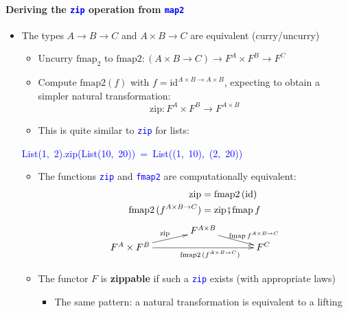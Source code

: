 \paragraph{Deriving the \texttt{\textcolor{blue}{\footnotesize{}zip}} operation
from \texttt{\textcolor{blue}{\footnotesize{}map2}} }
\begin{itemize}
\item The types $A\rightarrow B\rightarrow C$ and $A\times B\rightarrow C$
are equivalent (curry/uncurry)
\begin{itemize}
\item Uncurry $\text{fmap}_{2}$ to $\text{fmap2}:\left(A\times B\rightarrow C\right)\rightarrow F^{A}\times F^{B}\rightarrow F^{C}$ 
\item Compute $\text{fmap2}\left(f\right)$ with $f=\text{id}^{A\times B\rightarrow A\times B}$,
expecting to obtain a simpler natural transformation: 
\[
\text{zip}:F^{A}\times F^{B}\rightarrow F^{A\times B}
\]
 
\item This is quite similar to \texttt{\textcolor{blue}{\footnotesize{}zip}}
for lists:
\end{itemize}
\begin{lyxcode}
\textcolor{blue}{\footnotesize{}List(1,~2).zip(List(10,~20))~=~List((1,~10),~(2,~20))}~
\end{lyxcode}
\begin{itemize}
\item The functions \texttt{\textcolor{blue}{\footnotesize{}zip}} and \texttt{\textcolor{blue}{\footnotesize{}fmap2}}
are computationally equivalent:{\footnotesize{}
\begin{align*}
\text{zip} & =\text{fmap2}\left(\text{id}\right)\\
\text{fmap2}\,(f^{A\times B\rightarrow C}) & =\text{zip}\bef\text{fmap}\,f
\end{align*}
\[
\xymatrix{\xyScaleY{0.2pc}\xyScaleX{3pc} & F^{A\times B}\ar[rd]\sp(0.65){\ \ \text{fmap}\,f^{A\times B\rightarrow C}}\\
F^{A}\times F^{B}\ar[ru]\sp(0.5){\text{zip}}\ar[rr]\sb(0.6){\text{fmap2}\,(f^{A\times B\rightarrow C})} &  & F^{C}
}
\]
}{\footnotesize\par}
\item The functor $F$ is \textbf{zippable} if such a \texttt{\textcolor{blue}{\footnotesize{}zip}}
exists (with appropriate laws)
\begin{itemize}
\item The same pattern: a natural transformation is equivalent to a lifting
\end{itemize}
\end{itemize}
\end{itemize}


